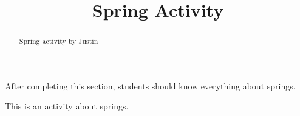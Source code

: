\documentclass{ximera}
\title{Spring Activity}
\begin{document}
\begin{abstract}
Spring activity by Justin
\end{abstract}

\begin{sectionOutcomes}
After completing this section, students should know everything about springs.

\end{sectionOutcomes}


\maketitle

This is an activity about springs.
\end{document}
